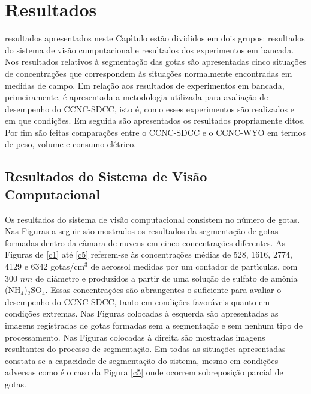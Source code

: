 \doublespacing
\chapter{Resultados}
\label{cap:Resultados}

 resultados apresentados neste Cap\'{\i}tulo est\~{a}o divididos em dois grupos: resultados do sistema de vis\~{a}o cumputacional e resultados dos experimentos em bancada. Nos resultados relativos \`{a} segmenta\c{c}\~{a}o das gotas s\~{a}o apresentadas cinco situa\c{c}\~{o}es de concentra\c{c}\~{o}es que correspondem \`{a}s situa\c{c}\~{o}es normalmente encontradas em medidas de campo. Em rela\c{c}\~{a}o aos resultados de experimentos em bancada, primeiramente, \'{e} apresentada a metodologia utilizada para avalia\c{c}\~{a}o de desempenho do CCNC-SDCC, isto \'{e}, como esses experimentos s\~{a}o realizados e em que condi\c{c}\~{o}es. Em seguida s\~{a}o apresentados os resultados propriamente ditos. Por fim s\~{a}o feitas compara\c{c}\~{o}es entre o CCNC-SDCC e o CCNC-WYO em termos de peso, volume e consumo el\'{e}trico.


\section{Resultados do Sistema de Vis\~{a}o Computacional}

Os resultados do sistema de vis\~{a}o computacional consistem no n\'{u}mero de gotas. Nas Figuras a seguir  s\~{a}o mostrados os resultados da segmenta\c{c}\~{a}o de gotas formadas dentro da c\^{a}mara de nuvens em cinco concentra\c{c}\~{o}es diferentes. As Figuras de \ref{c1} at\'{e} \ref{c5} referem-se \`{a}s concentra\c{c}\~{o}es m\'{e}dias de 528, 1616, 2774, 4129 e 6342 gotas/cm$^3$ de aerossol medidas por um contador de part\'{\i}culas, com 300 $nm$ de di\^{a}metro e produzidos a partir de uma solu\c{c}\~{a}o de sulfato de am\^{o}nia (NH$_4$)$_2$SO$_4$. Essas concentra\c{c}\~{o}es s\~{a}o abrangentes o suficiente para avaliar o desempenho do CCNC-SDCC, tanto em condi\c{c}\~{o}es favor\'{a}veis quanto em condi\c{c}\~{o}es extremas. Nas Figuras colocadas \`{a} esquerda s\~{a}o apresentadas as imagens registradas de gotas formadas sem a segmenta\c{c}\~{a}o e sem nenhum tipo de processamento. Nas Figuras colocadas \`{a} direita s\~{a}o mostradas imagens resultantes do processo de segmenta\c{c}\~{a}o. Em todas as situa\c{c}\~{o}es apresentadas constata-se a capacidade de segmenta\c{c}\~{a}o do sistema, mesmo em condi\c{c}\~{o}es adversas como \'{e} o caso da Figura \ref{c5} onde ocorrem sobreposi\c{c}\~{a}o parcial de gotas.

